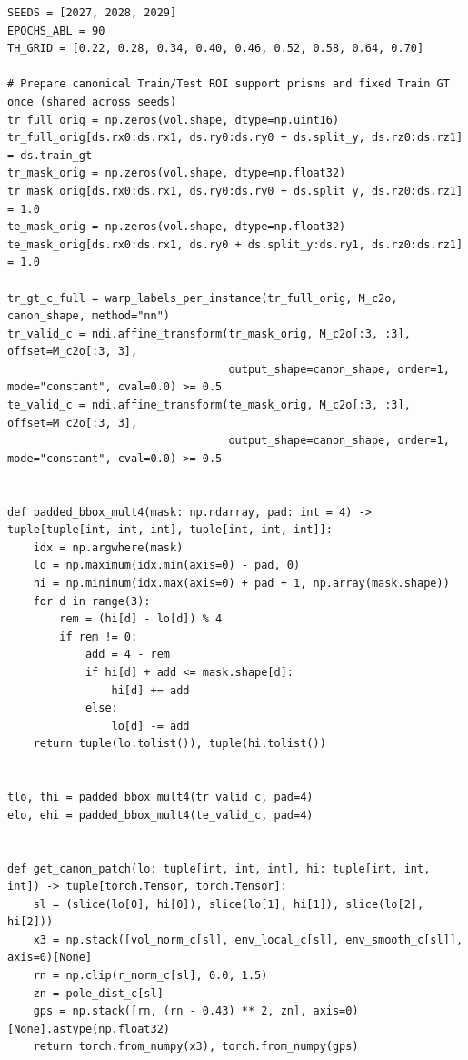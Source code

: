 \documentclass[10pt,a4paper]{article}
\renewcommand{\_}{\origunderscore\allowbreak}
\begin{document}
\begin{codebox}
\begin{lstlisting}[style=pybmed]
SEEDS = [2027, 2028, 2029]
EPOCHS_ABL = 90
TH_GRID = [0.22, 0.28, 0.34, 0.40, 0.46, 0.52, 0.58, 0.64, 0.70]

# Prepare canonical Train/Test ROI support prisms and fixed Train GT once (shared across seeds)
tr_full_orig = np.zeros(vol.shape, dtype=np.uint16)
tr_full_orig[ds.rx0:ds.rx1, ds.ry0:ds.ry0 + ds.split_y, ds.rz0:ds.rz1] = ds.train_gt
tr_mask_orig = np.zeros(vol.shape, dtype=np.float32)
tr_mask_orig[ds.rx0:ds.rx1, ds.ry0:ds.ry0 + ds.split_y, ds.rz0:ds.rz1] = 1.0
te_mask_orig = np.zeros(vol.shape, dtype=np.float32)
te_mask_orig[ds.rx0:ds.rx1, ds.ry0 + ds.split_y:ds.ry1, ds.rz0:ds.rz1] = 1.0

tr_gt_c_full = warp_labels_per_instance(tr_full_orig, M_c2o, canon_shape, method="nn")
tr_valid_c = ndi.affine_transform(tr_mask_orig, M_c2o[:3, :3], offset=M_c2o[:3, 3],
                                  output_shape=canon_shape, order=1, mode="constant", cval=0.0) >= 0.5
te_valid_c = ndi.affine_transform(te_mask_orig, M_c2o[:3, :3], offset=M_c2o[:3, 3],
                                  output_shape=canon_shape, order=1, mode="constant", cval=0.0) >= 0.5


def padded_bbox_mult4(mask: np.ndarray, pad: int = 4) -> tuple[tuple[int, int, int], tuple[int, int, int]]:
    idx = np.argwhere(mask)
    lo = np.maximum(idx.min(axis=0) - pad, 0)
    hi = np.minimum(idx.max(axis=0) + pad + 1, np.array(mask.shape))
    for d in range(3):
        rem = (hi[d] - lo[d]) % 4
        if rem != 0:
            add = 4 - rem
            if hi[d] + add <= mask.shape[d]:
                hi[d] += add
            else:
                lo[d] -= add
    return tuple(lo.tolist()), tuple(hi.tolist())


tlo, thi = padded_bbox_mult4(tr_valid_c, pad=4)
elo, ehi = padded_bbox_mult4(te_valid_c, pad=4)


def get_canon_patch(lo: tuple[int, int, int], hi: tuple[int, int, int]) -> tuple[torch.Tensor, torch.Tensor]:
    sl = (slice(lo[0], hi[0]), slice(lo[1], hi[1]), slice(lo[2], hi[2]))
    x3 = np.stack([vol_norm_c[sl], env_local_c[sl], env_smooth_c[sl]], axis=0)[None]
    rn = np.clip(r_norm_c[sl], 0.0, 1.5)
    zn = pole_dist_c[sl]
    gps = np.stack([rn, (rn - 0.43) ** 2, zn], axis=0)[None].astype(np.float32)
    return torch.from_numpy(x3), torch.from_numpy(gps)



\end{lstlisting}
\end{codebox}
\end{document}
